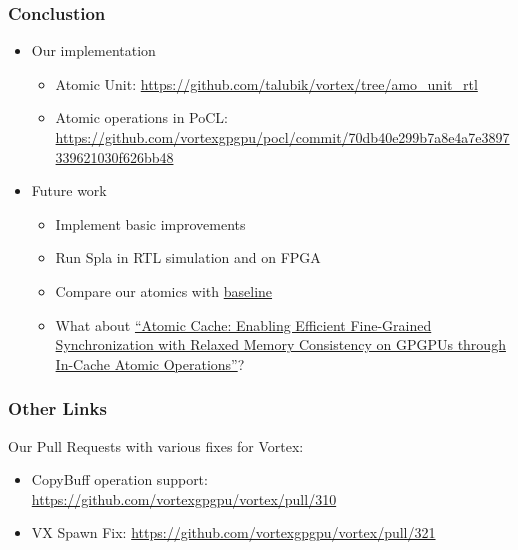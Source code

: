 \documentclass[aspectratio=169]{beamer}
\begin{document}
\begin{frame}
  \frametitle{Conclustion}
  \begin{itemize}
    \item Our implementation
    \begin{itemize}
      \item Atomic Unit: \url{https://github.com/talubik/vortex/tree/amo_unit_rtl}
      \item Atomic operations in PoCL: \url{https://github.com/vortexgpgpu/pocl/commit/70db40e299b7a8e4a7e3897339621030f626bb48}
    \end{itemize}
    \item Future work
    \begin{itemize}
      \item Implement basic improvements
      \item Run Spla in RTL simulation and on FPGA
      \item Compare our atomics with \href{https://github.com/Vaibhav110/Vortex_gpgpu_atomicity/commits/master/}{baseline}
      \item What about \href{https://ieeexplore.ieee.org/document/10764542}{``Atomic Cache: Enabling Efficient Fine-Grained Synchronization with Relaxed Memory Consistency on GPGPUs through In-Cache Atomic Operations''}?
    \end{itemize}
  \end{itemize}
\end{frame}


\begin{frame}
  \frametitle{Other Links}
  Our Pull Requests with various fixes for Vortex:
  \begin{itemize}
    \item CopyBuff operation support: \url{https://github.com/vortexgpgpu/vortex/pull/310}
    \item VX Spawn Fix: \url{https://github.com/vortexgpgpu/vortex/pull/321}
  \end{itemize}
\end{frame}
\end{document}
